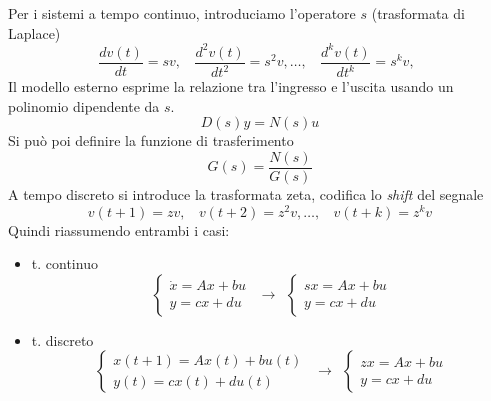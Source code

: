 \documentclass[10pt,a4paper]{book}
\begin{document}
Per i sistemi a tempo continuo, introduciamo l'operatore $s$ (trasformata di Laplace)
\begin{equation*}
\frac{dv(t)}{dt} =sv,\ \ \ \ \frac{d^2 v(t)}{dt^2} =s^2 v,\dotsc ,\ \ \ \ \frac{d^k v(t)}{dt^k} =s^k v,\ \ 
\end{equation*}
Il modello esterno esprime la relazione tra l'ingresso e l'uscita usando un polinomio dipendente da $s$.
\begin{equation*}
D(s) y=N(s) u
\end{equation*}
Si può poi definire la funzione di trasferimento
\begin{equation*}
\boxed{G(s) =\frac{N(s)}{G(s)}}
\end{equation*}
A tempo discreto si introduce la trasformata zeta, codifica lo \textit{shift} del segnale
\begin{equation*}
v( t+1) =zv,\ \ \ \ v( t+2) =z^2 v,\dotsc ,\ \ \ \ v( t+k) =z^k v
\end{equation*}
Quindi riassumendo entrambi i casi:
\begin{itemize}
\item t. continuo\begin{equation*}
\begin{cases}
\dot{x} =Ax+bu\\
y=cx+du
\end{cases} \ \ \rightarrow \ \ \begin{cases}
sx=Ax+bu\\
y=cx+du
\end{cases}
\end{equation*}
\item t. discreto\begin{equation*}
\begin{cases}
x(t+1)=Ax(t)+bu(t)\\
y(t)=cx(t)+du(t)
\end{cases} \ \ \rightarrow \ \ \begin{cases}
zx=Ax+bu\\
y=cx+du
\end{cases}
\end{equation*}
\end{itemize}
\end{document}
